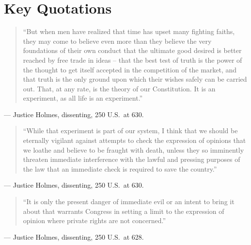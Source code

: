 \documentclass[12pt]{article}
\begin{document}
\section{Key Quotations}

\begin{quote}
``But when men have realized that time has upset many fighting faiths, they may come to believe even more than they believe the very foundations of their own conduct that the ultimate good desired is better reached by free trade in ideas -- that the best test of truth is the power of the thought to get itself accepted in the competition of the market, and that truth is the only ground upon which their wishes safely can be carried out. That, at any rate, is the theory of our Constitution. It is an experiment, as all life is an experiment.''
\end{quote}
\noindent --- Justice Holmes, dissenting, 250 U.S.\ at 630.

\begin{quote}
``While that experiment is part of our system, I think that we should be eternally vigilant against attempts to check the expression of opinions that we loathe and believe to be fraught with death, unless they so imminently threaten immediate interference with the lawful and pressing purposes of the law that an immediate check is required to save the country.''
\end{quote}
\noindent --- Justice Holmes, dissenting, 250 U.S.\ at 630.

\begin{quote}
``It is only the present danger of immediate evil or an intent to bring it about that warrants Congress in setting a limit to the expression of opinion where private rights are not concerned.''
\end{quote}
\noindent --- Justice Holmes, dissenting, 250 U.S.\ at 628.
\end{document}
